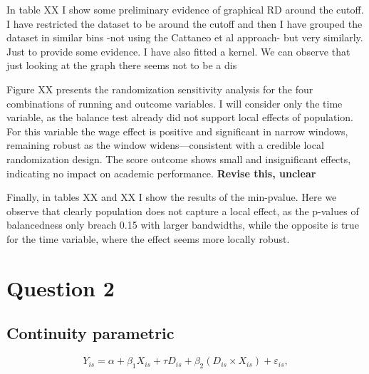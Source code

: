 \documentclass{article}
\begin{document}
In table XX I show some preliminary evidence of graphical RD around the cutoff. I have restricted the dataset to be around the cutoff and then I have grouped the dataset in similar bins -not using the Cattaneo et al approach- but very similarly. Just to provide some evidence. I have also fitted a kernel. We can observe that just looking at the graph there seems not to be a dis

Figure XX presents the randomization sensitivity analysis for the four combinations of running and outcome variables. I will consider only the time variable, as the balance test already did not support local effects of population. For this variable the wage effect is positive and significant in narrow windows, remaining robust as the window widens—consistent with a credible local randomization design. The score outcome shows small and insignificant effects, indicating no impact on academic performance.
\textbf{Revise this, unclear}

Finally, in tables XX and XX I show the results of the min-pvalue. Here we observe that clearly population does not capture a local effect, as the p-values of balancedness only breach 0.15 with larger bandwidths, while the opposite is true for the time variable, where the effect seems more locally robust. 



\section{Question 2}

\subsection{Continuity parametric}
\begin{equation}
Y_{is} = \alpha + \beta_1 X_{is} + \tau D_{is} + \beta_2 (D_{is} \times X_{is}) + \varepsilon_{is},
\label{eq:global_rd}
\end{equation}
\end{document}
